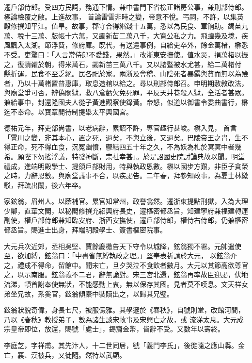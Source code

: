 \begin{pinyinscope}
 遷戶部侍郎。受四方民詞，務通下情。兼中書門下省檢正諸房公事，兼刑部侍郎。極論檢覆之敝。上進故事，
 首論雷雪非時之變，帝意不悅。丐祠，不許，以集英殿修撰知平江。值旱。故事，郡守合得緡錢十五萬，悉以為民食、軍餉助。蠲苗九萬、稅十三萬、版帳十六萬，又蠲新苗二萬八千，大寬公私之力。飛蝗幾及境，疾風飄入太湖。節浮費，修府庫。既代，有送還事例，自給吏卒外，餘金萬楮，楙悉不受。吏驚曰：「人言常侍郎不愛錢，果然。」改浙東安撫使。值水災，捐萬楮以振之，復請糴於朝，得米萬石，蠲新苗三萬八千。又以諸暨被水尤甚，給二萬楮付
 縣折運，民食不至乏絕。民各祀於家。兩浙及會稽、山陰死者暴露與貧而無以為殮者，乃以十萬楮置普惠庫，取息造棺以給之。尋以刑部侍郎召。申明期赦敘改法，與廟堂爭可否，辨偽關獄，救八倉虧欠免死罪，平反天井巷殺人獄，全活者甚眾。兼給事中，封還隆國夫人從子黃進觀察使錄黃。帝怒，似道以御書令委曲書行，楙迄不奉命。以寶章閣待制提舉太平興國宮。



 德祐元年，拜吏部尚書，以老病辭，累詔不許，專官趣行甚峻。楙入見，
 首言「霅川之變，非其本心，置之死，過矣，不與立後，又過矣。巴陵帝王之胄，生不得正命，死不得血食，沉冤幽憤，鬱結四五十年之久，不為妖為札於冥冥中者幾希。願陛下勿搖浮議，特發神斷，宗社幸甚」。於是詔國史院討論典故以聞。明堂禮成，進端明殿學士、提領戶部財用，特與執政恩數。楙以國步方艱，非臣子貪榮之時，力辭恩數。與廟堂議事不合，以疾謁告。二年春，拜參知政事，為夏士林繳駁，拜疏出關，後六年卒。



 家鉉翁，眉州人。以蔭補官。累官知常州，政譽翕然。遷浙東提點刑獄，入為大理少卿，直華文閣，以秘閣修撰充紹興府長史，遷樞密都丞旨，知建寧府兼福建轉運副使，權戶部侍郎兼知臨安府、浙西安撫使，遷戶部侍郎，權侍右侍郎，仍兼樞密都丞旨。賜進士出身，拜端明殿學士、簽書樞密院事。



 大元兵次近郊，丞相吳堅、賈餘慶檄告天下守令以城降，鉉翁獨不署。元帥遣使至，欲加縛，鉉翁曰：「中書省無縛執政之理。」堅奉表祈請於大元，
 以鉉翁介之，禮成不得命，留館中。聞宋亡，旦夕哭泣不食飲者數月。大元以其節高欲尊官之，以示南服。鉉翁義不二君，辭無詭對。宋三宮北還，鉉翁再率故臣迎謁，伏地流涕，頓首謝奉使無狀，不能感動上衷，無以保存其國。見者莫不嘆息。文天祥女弟坐兄故，系奚官，鉉翁傾橐中裝贖出之，以歸其兄璧。



 鉉翁狀貌奇偉，身長七尺，被服儼雅。其學邃於《春秋》，自號則堂，改館河間，乃以《春秋》教授弟子，數為諸生談宋故事及宋興亡之故，或
 流涕太息。大元成宗皇帝即位，放還，賜號「處士」，錫齎金幣，皆辭不受。又數年以壽終。



 李庭芝，字祥甫。其先汴人，十二世同居，號「義門李氏」，後徙隨之應山縣。金亡，襄、漢被兵，又徙隨。然特以武顯。




\end{pinyinscope}

